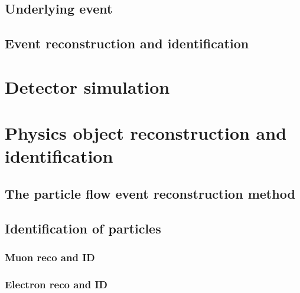 \subsection{Underlying event}
\begin{comment}
\end{comment}
\subsection{Event reconstruction and identification}

\section{Detector simulation}
\section{Physics object reconstruction and identification}
\subsection{The particle flow event reconstruction method}
\subsection{Identification of particles}
\subsubsection{Muon reco and ID}
\subsubsection{Electron reco and ID}

